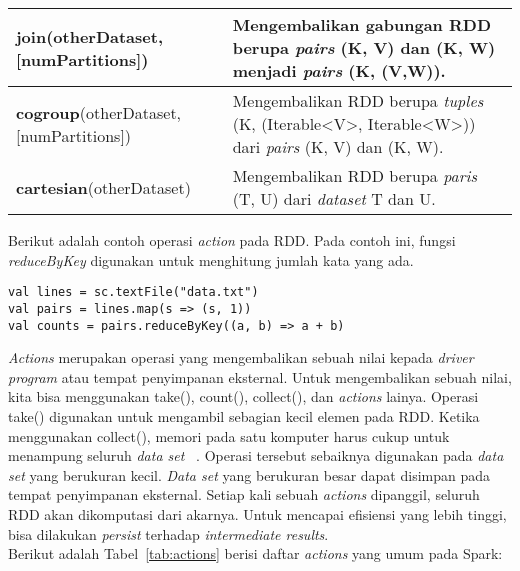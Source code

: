 \begin{table}[H]
\begin{tabular}{p{6cm}p{9cm}}
\hline
\textbf{join}(otherDataset, [numPartitions]) & Mengembalikan gabungan RDD berupa \textit{pairs}  (K, V) dan (K, W) menjadi \textit{pairs} (K, (V,W)).\\

\hline
\textbf{cogroup}(otherDataset, [numPartitions]) & Mengembalikan RDD berupa \textit{tuples}  (K, (Iterable<V>, Iterable<W>)) dari \textit{pairs} (K, V) dan (K, W).\\

\hline
\textbf{cartesian}(otherDataset) & Mengembalikan RDD berupa \textit{paris}  (T, U) dari \textit{dataset} T dan U.\\

\hline


\bottomrule
		
	\end{tabular} 
\end{table}

Berikut adalah contoh operasi \textit{action} pada RDD. Pada contoh ini, fungsi \textit{reduceByKey} digunakan untuk menghitung jumlah kata yang ada.

\begin{verbatim}
val lines = sc.textFile("data.txt") 
val pairs = lines.map(s => (s, 1))
val counts = pairs.reduceByKey((a, b) => a + b)
\end{verbatim}

\textit{Actions} merupakan operasi yang mengembalikan sebuah nilai kepada \textit{driver program} atau tempat penyimpanan eksternal. Untuk mengembalikan sebuah nilai, kita bisa menggunakan take(), count(), collect(), dan \textit{actions} lainya. Operasi take() digunakan untuk mengambil sebagian kecil elemen pada RDD. Ketika menggunakan collect(), memori pada satu komputer harus cukup untuk menampung seluruh \textit{data set} ~\cite{holdenkarau:07:ls}. Operasi tersebut sebaiknya digunakan pada \textit{data set} yang berukuran kecil. \textit{Data set} yang berukuran besar dapat disimpan pada tempat penyimpanan eksternal. Setiap kali sebuah \textit{actions} dipanggil, seluruh RDD akan dikomputasi dari akarnya. Untuk mencapai efisiensi yang lebih tinggi, bisa dilakukan \textit{persist} terhadap \textit{intermediate results}. \\

Berikut adalah Tabel~\ref{tab:actions} berisi daftar \textit{actions} yang umum pada Spark:


